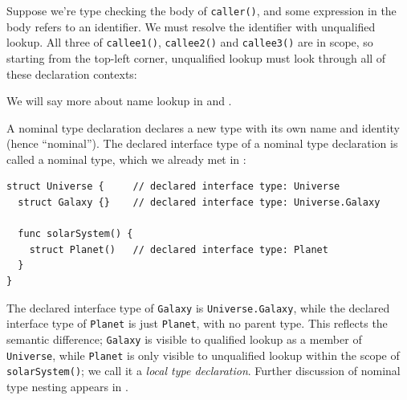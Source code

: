 \documentclass[../generics]{subfiles}
\begin{document}
Suppose we're type checking the body of \texttt{caller()}, and some expression in the body refers to an identifier. We must resolve the identifier with unqualified lookup. All three of \texttt{callee1()}, \texttt{callee2()} and \texttt{callee3()} are in scope, so starting from the top-left corner, unqualified lookup must look through all of these declaration contexts:
\begin{center}
\end{center}
We will say more about name lookup in  and .

A nominal type declaration declares a new type with its own name and identity (hence ``nominal''). The declared interface type of a nominal type declaration is called a nominal type, which we already met in :
\begin{Verbatim}
struct Universe {     // declared interface type: Universe
  struct Galaxy {}    // declared interface type: Universe.Galaxy

  func solarSystem() {
    struct Planet()   // declared interface type: Planet
  }
}
\end{Verbatim}
The declared interface type of \texttt{Galaxy} is \texttt{Universe.Galaxy}, while the declared interface type of \texttt{Planet} is just \texttt{Planet}, with no parent type. This reflects the semantic difference; \texttt{Galaxy} is visible to qualified lookup as a member of \texttt{Universe}, while \texttt{Planet} is only visible to unqualified lookup within the scope of \texttt{solarSystem()}; we call it a \emph{local type declaration}. Further discussion of nominal type nesting appears in .
\end{document}

